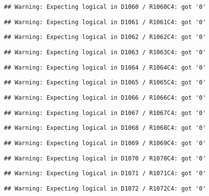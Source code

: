 \documentclass[
]{article}
\begin{document}
\begin{verbatim}
## Warning: Expecting logical in D1060 / R1060C4: got '0'
\end{verbatim}

\begin{verbatim}
## Warning: Expecting logical in D1061 / R1061C4: got '0'
\end{verbatim}

\begin{verbatim}
## Warning: Expecting logical in D1062 / R1062C4: got '0'
\end{verbatim}

\begin{verbatim}
## Warning: Expecting logical in D1063 / R1063C4: got '0'
\end{verbatim}

\begin{verbatim}
## Warning: Expecting logical in D1064 / R1064C4: got '0'
\end{verbatim}

\begin{verbatim}
## Warning: Expecting logical in D1065 / R1065C4: got '0'
\end{verbatim}

\begin{verbatim}
## Warning: Expecting logical in D1066 / R1066C4: got '0'
\end{verbatim}

\begin{verbatim}
## Warning: Expecting logical in D1067 / R1067C4: got '0'
\end{verbatim}

\begin{verbatim}
## Warning: Expecting logical in D1068 / R1068C4: got '0'
\end{verbatim}

\begin{verbatim}
## Warning: Expecting logical in D1069 / R1069C4: got '0'
\end{verbatim}

\begin{verbatim}
## Warning: Expecting logical in D1070 / R1070C4: got '0'
\end{verbatim}

\begin{verbatim}
## Warning: Expecting logical in D1071 / R1071C4: got '0'
\end{verbatim}

\begin{verbatim}
## Warning: Expecting logical in D1072 / R1072C4: got '0'
\end{verbatim}
\end{document}
